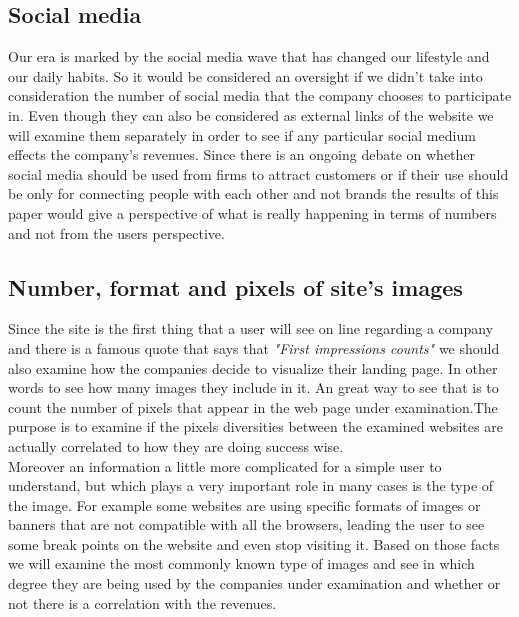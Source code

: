 \documentclass{book}
\begin{document}
\subsection{Social media}\label{M:Social media}
Our era is marked by the social media wave that has changed our lifestyle and our daily habits. So it would be considered an oversight if we didn't take into consideration the number of social media that the company chooses to participate in. Even though they can also be considered as external links of the website we will examine them separately in order to see if any particular social medium effects the company's revenues. Since there is an ongoing debate on whether social media should be used from firms to attract customers or if their use should be only for connecting people with each other and not brands the results of this paper would give a perspective of what is really happening in terms of numbers and not from the users perspective.
\subsection{Number, format and pixels of site's images}\label{M:N,T,S Imgs}
Since the site is the first thing that a user will see on line regarding a company and there is a famous quote that says that \textit{"First impressions counts"} we should also examine how the companies decide to visualize their landing page. In other words to see how many images they include in it. An great way to see that is to count the number of pixels that appear in the web page under examination.The purpose is to examine if the pixels diversities between the examined websites are actually correlated to how they are doing success wise.\\
Moreover an information a little more complicated for a simple user to understand, but which  plays a very important role in many cases is the type of the image. For example some websites are using specific formats of images or banners that are not compatible with all the browsers, leading the user to see some break points on the website and even stop visiting it. Based on those facts we will examine the most commonly known type of images and see in which degree they are being used by the companies under examination and whether or not there is a correlation with the revenues.
\end{document}
